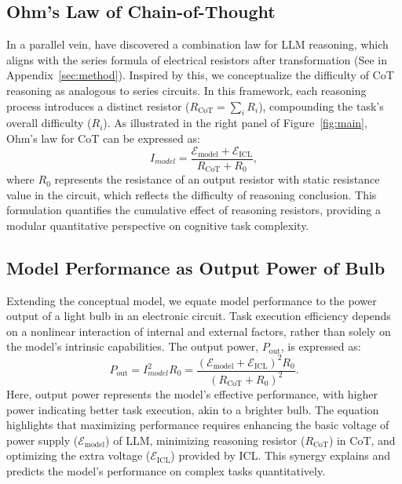 \subsection{Ohm's Law of Chain-of-Thought}
In a parallel vein, \citet{chen2024unlocking} have discovered a combination law for LLM reasoning, which aligns with the series formula of electrical resistors after transformation (See in Appendix~\ref{sec:method}).
Inspired by this, we conceptualize the difficulty of CoT reasoning as analogous to series circuits. In this framework, each reasoning process introduces a distinct resistor ($R_{\text{CoT}}=\sum_i R_i$), compounding the task's overall difficulty ($R_i$). As illustrated in the right panel of Figure~\ref{fig:main}, Ohm's law for CoT can be expressed as:
\begin{equation}
    I_{model} = \frac{\mathcal{E}_{\text{model}} + \mathcal{E}_{\text{ICL}}}{R_{\text{CoT}} + R_0},\label{eq:ohm}
\end{equation}
where $R_0$ represents the resistance of an output resistor with static resistance value in the circuit, which reflects the difficulty of reasoning conclusion.
This formulation quantifies the cumulative effect of reasoning resistors, providing a modular quantitative perspective on cognitive task complexity.



\subsection{Model Performance as Output Power of Bulb}
Extending the conceptual model, we equate model performance to the power output of a light bulb in an electronic circuit. Task execution efficiency depends on a nonlinear interaction of internal and external factors, rather than solely on the model’s intrinsic capabilities. The output power, $P_{\text{out}}$, is expressed as:
\begin{equation}
    P_{\text{out}} = I^2_{model} R_0 =\frac{\left(\mathcal{E}_{\text{model}} + \mathcal{E}_{\text{ICL}}\right)^2 R_0}{(R_{\text{CoT}} + R_0)^2}.\label{eq:power}
\end{equation}
Here, output power represents the model's effective performance, with higher power indicating better task execution, akin to a brighter bulb. The equation highlights that maximizing performance requires enhancing the basic voltage of power supply ($\mathcal{E}_{\text{model}}$) of LLM, minimizing reasoning resistor ($R_{\text{CoT}}$) in CoT, and optimizing the extra voltage ($\mathcal{E}_{\text{ICL}}$) provided by ICL. This synergy explains and predicts the model’s performance on complex tasks quantitatively.